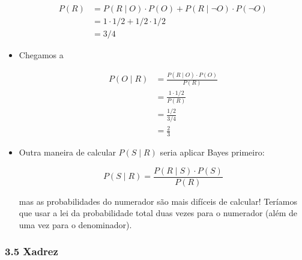 \documentclass[
  11pt]{report}
\begin{document}
\begin{itemize}
  \[
  \begin{aligned}
  P(R) 
  &= P(R \mid O) \cdot P(O) + P(R \mid \neg O) \cdot P(\neg O) \\
  &= 1 \cdot 1/2 + 1/2 \cdot 1/2 \\
  &= 3/4
  \end{aligned}
  \]
\item
  Chegamos a

  \[
  \begin{aligned}
  P(O \mid R) 
  &= \frac{P(R \mid O) \cdot P(O)}{P(R)} \\
  &= \frac{1 \cdot 1/2}{P(R)} \\
  &= \frac{1/2}{3/4} \\
  &= \frac{2}{3}
  \end{aligned}
  \]
\item
  Outra maneira de calcular $P(S \mid R)$ seria aplicar Bayes primeiro:

  \[
  P(S \mid R) = \frac{P(R \mid S) \cdot P(S)}{P(R)}
  \]

  mas as probabilidades do numerador são mais difíceis de calcular! Teríamos que usar a lei da probabilidade total duas vezes para o numerador (além de uma vez para o denominador).
\end{itemize}

\hypertarget{xadrez}{%
\subsubsection*{3.5 Xadrez}\label{xadrez}}
\end{document}
